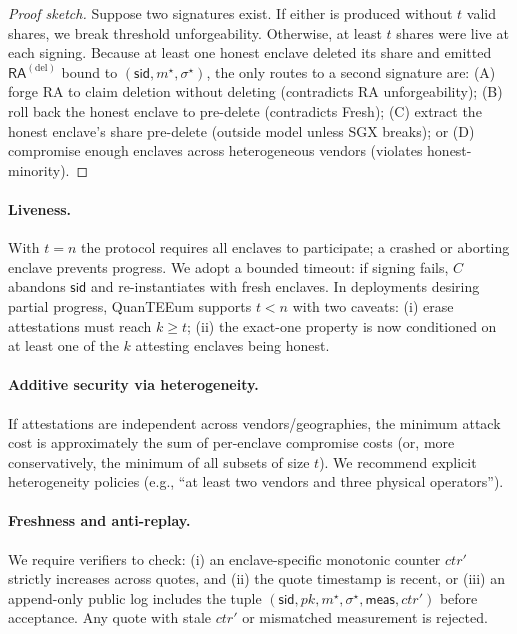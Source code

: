 \documentclass[runningheads,orivec]{llncs}
\newcommand{\prot}{\textsf{QuanTEEum}}
\newcommand{\sid}{\mathsf{sid}}
\newcommand{\RA}{\mathsf{RA}}
\begin{document}
\begin{proof}[Proof sketch]
Suppose two signatures exist. If either is produced without $t$ valid shares, we break threshold unforgeability. Otherwise, at least $t$ shares were live at each signing. Because at least one honest enclave deleted its share and emitted $\RA^{(\mathrm{del})}$ bound to $(\mathsf{sid},m^{\star},\sigma^{\star})$, the only routes to a second signature are: (A) forge RA to claim deletion without deleting (contradicts RA unforgeability); (B) roll back the honest enclave to pre-delete (contradicts \textsf{Fresh}); (C) extract the honest enclave's share pre-delete (outside model unless SGX breaks); or (D) compromise enough enclaves across heterogeneous vendors (violates honest-minority).
\end{proof}

\paragraph{Liveness.}
With $t=n$ the protocol requires all enclaves to participate; a crashed or aborting enclave prevents progress. We adopt a bounded timeout: if signing fails, $C$ abandons $\sid$ and re-instantiates with fresh enclaves. In deployments desiring partial progress, \prot{} supports $t<n$ with two caveats: (i) erase attestations must reach $k\!\ge\!t$; (ii) the exact-one property is now conditioned on at least one of the $k$ attesting enclaves being honest.

\paragraph{Additive security via heterogeneity.}
If attestations are independent across vendors/geographies, the minimum attack cost is approximately the sum of per-enclave compromise costs (or, more conservatively, the minimum of all subsets of size $t$). We recommend explicit heterogeneity policies (e.g., “at least two vendors and three physical operators”).

\paragraph{Freshness and anti-replay.}
We require verifiers to check: (i) an enclave-specific monotonic counter $ctr'$ strictly increases across quotes, and (ii) the quote timestamp is recent, or (iii) an append-only public log includes the tuple $(\mathsf{sid},pk,m^{\star},\sigma^{\star},\mathsf{meas},ctr')$ before acceptance. Any quote with stale $ctr'$ or mismatched measurement is rejected.
\end{document}
